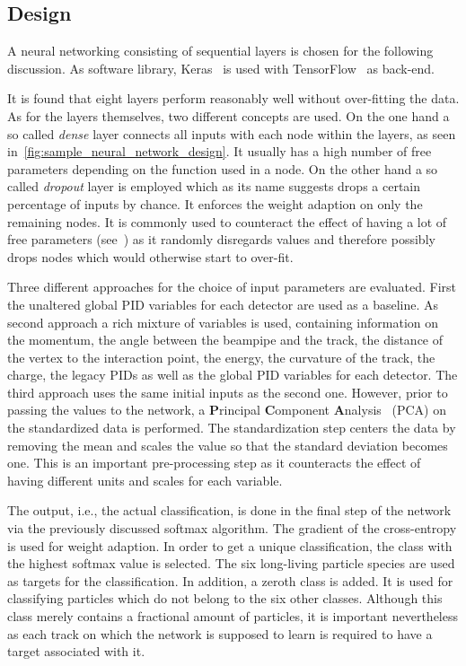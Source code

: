 \subsection{Design}
\label{sec:neural_network_design}

A neural networking consisting of sequential layers is chosen for the following discussion. As software library, Keras~\cite{chollet2015keras} is used with TensorFlow~\cite{tensorflow2015-whitepaper} as back-end.

It is found that eight layers perform reasonably well without over-fitting the data. As for the layers themselves, two different concepts are used. On the one hand a so called \textit{dense} layer connects all inputs with each node within the layers, as seen in~\autoref{fig:sample_neural_network_design}. It usually has a high number of free parameters depending on the function used in a node. On the other hand a so called \textit{dropout} layer is employed which as its name suggests drops a certain percentage of inputs by chance. It enforces the weight adaption on only the remaining nodes. It is commonly used to counteract the effect of having a lot of free parameters (see~\cite{MachineLearning:DeepLearning}) as it randomly disregards values and therefore possibly drops nodes which would otherwise start to over-fit.

Three different approaches for the choice of input parameters are evaluated. First the unaltered global PID variables for each detector are used as a baseline. As second approach a rich mixture of variables is used, containing information on the momentum, the angle between the beampipe and the track, the distance of the vertex to the interaction point, the energy, the curvature of the track, the charge, the legacy PIDs as well as the global PID variables for each detector. The third approach uses the same initial inputs as the second one. However, prior to passing the values to the network, a \textbf{P}rincipal \textbf{C}omponent \textbf{A}nalysis~\cite{BigDataManagementAndAnalytics:TextProcessingAndHigh-DimensionalData} (PCA) on the standardized data is performed. The standardization step centers the data by removing the mean and scales the value so that the standard deviation becomes one. This is an important pre-processing step as it counteracts the effect of having different units and scales for each variable.

The output, i.e., the actual classification, is done in the final step of the network via the previously discussed softmax algorithm. The gradient of the cross-entropy is used for weight adaption. In order to get a unique classification, the class with the highest softmax value is selected. The six long-living particle species are used as targets for the classification. In addition, a zeroth class is added. It is used for classifying particles which do not belong to the six other classes. Although this class merely contains a fractional amount of particles, it is important nevertheless as each track on which the network is supposed to learn is required to have a target associated with it.

